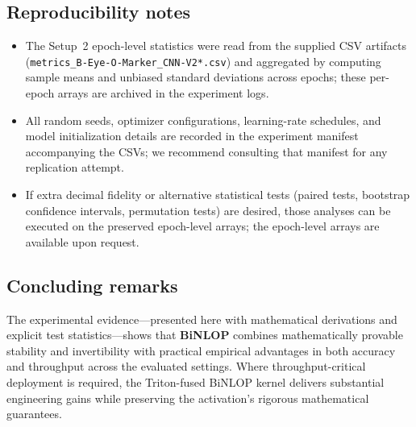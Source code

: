 \documentclass[11pt, twoside, openright, english]{article}
\numberwithin{equation}{section}
\theoremstyle{plain}
\theoremstyle{definition}
\theoremstyle{remark}
\begin{document}
\subsection{Reproducibility notes}
\begin{itemize}
  \item The Setup~2 epoch-level statistics were read from the supplied CSV artifacts (\texttt{metrics\_B-Eye-O-Marker\_CNN-V2*.csv}) and aggregated by computing sample means and unbiased standard deviations across epochs; these per-epoch arrays are archived in the experiment logs.
  \item All random seeds, optimizer configurations, learning-rate schedules, and model initialization details are recorded in the experiment manifest accompanying the CSVs; we recommend consulting that manifest for any replication attempt.
  \item If extra decimal fidelity or alternative statistical tests (paired tests, bootstrap confidence intervals, permutation tests) are desired, those analyses can be executed on the preserved epoch-level arrays; the epoch-level arrays are available upon request.
\end{itemize}

\subsection{Concluding remarks}
The experimental evidence—presented here with mathematical derivations and explicit test statistics—shows that \textbf{BiNLOP} combines mathematically provable stability and invertibility with practical empirical advantages in both accuracy and throughput across the evaluated settings. Where throughput-critical deployment is required, the Triton-fused BiNLOP kernel delivers substantial engineering gains while preserving the activation's rigorous mathematical guarantees.

\clearpage
{}
{}
\printbibliography[heading=bibintoc,title={References}]
\end{document}
